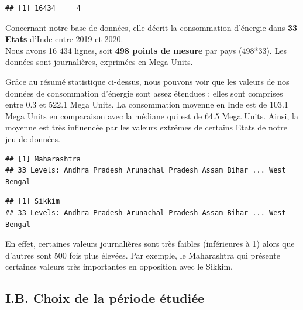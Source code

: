 \documentclass[
]{article}
\newenvironment{Shaded}{\begin{snugshade}}{\end{snugshade}}
\newcommand{\FunctionTok}[1]{\textcolor[rgb]{0.00,0.00,0.00}{#1}}
\newcommand{\NormalTok}[1]{#1}
\newcommand{\SpecialCharTok}[1]{\textcolor[rgb]{0.00,0.00,0.00}{#1}}
\begin{document}
\begin{verbatim}
## [1] 16434     4
\end{verbatim}

Concernant notre base de données, elle décrit la consommation d'énergie
dans \textbf{33 Etats} d'Inde entre 2019 et 2020.\\
Nous avons 16 434 lignes, soit \textbf{498 points de mesure} par pays
(498*33). Les données sont journalières, exprimées en Mega Units.

Grâce au résumé statistique ci-dessus, nous pouvons voir que les valeurs
de nos données de consommation d'énergie sont assez étendues : elles
sont comprises entre 0.3 et 522.1 Mega Units. La consommation moyenne en
Inde est de 103.1 Mega Units en comparaison avec la médiane qui est de
64.5 Mega Units. Ainsi, la moyenne est très influencée par les valeurs
extrêmes de certains Etats de notre jeu de données.\\

\begin{Shaded}
\end{Shaded}

\begin{verbatim}
## [1] Maharashtra
## 33 Levels: Andhra Pradesh Arunachal Pradesh Assam Bihar ... West Bengal
\end{verbatim}

\begin{Shaded}
\end{Shaded}

\begin{verbatim}
## [1] Sikkim
## 33 Levels: Andhra Pradesh Arunachal Pradesh Assam Bihar ... West Bengal
\end{verbatim}

En effet, certaines valeurs journalières sont très faibles (inférieures
à 1) alors que d'autres sont 500 fois plus élevées. Par exemple, le
Maharashtra qui présente certaines valeurs très importantes en
opposition avec le Sikkim.

\hypertarget{i.b.-choix-de-la-puxe9riode-uxe9tudiuxe9e}{%
\subsection{I.B. Choix de la période
étudiée}\label{i.b.-choix-de-la-puxe9riode-uxe9tudiuxe9e}}
\end{document}
